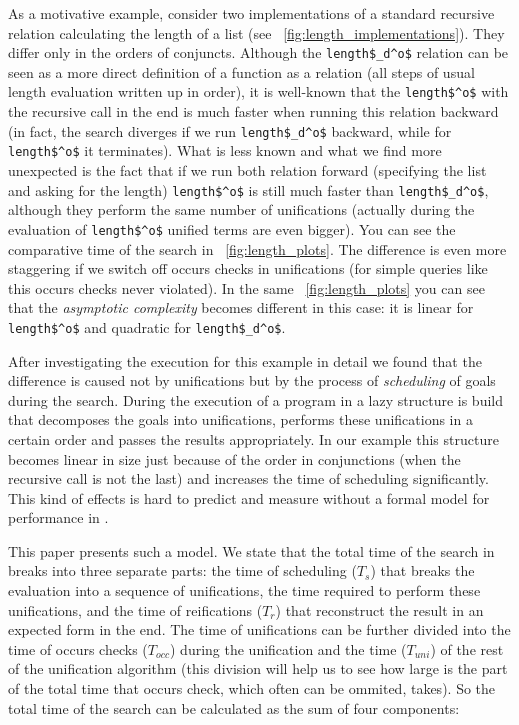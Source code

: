 As a motivative example, consider two implementations of a standard recursive relation calculating the length of a list (see \figureword~\ref{fig:length_implementations}). They differ only in the
orders of conjuncts. Although the \lstinline|length$_d^o$| relation can be seen as a more direct definition of a function as a relation (all steps of usual length evaluation written up in order),
it is well-known that the \lstinline|length$^o$| with the recursive call in the end is much faster when running this relation backward (in fact, the search diverges if we
run \lstinline|length$_d^o$| backward, while for \lstinline|length$^o$| it terminates). What is less known and what we find more unexpected is the fact that if we run both relation
forward (specifying the list and asking for the length) \lstinline|length$^o$| is still much faster than \lstinline|length$_d^o$|, although they perform the same number of unifications
(actually during the evaluation of \lstinline|length$^o$| unified terms are even bigger). You can see the comparative time of the search in \figureword~\ref{fig:length_plots}. The difference is even
more staggering if we switch off occurs checks in unifications (for simple queries like this occurs checks never violated). In the same \figureword~\ref{fig:length_plots} you can see that
the \emph{asymptotic complexity} becomes different in this case: it is linear for \lstinline|length$^o$| and quadratic for \lstinline|length$_d^o$|.

After investigating the execution for this example in detail we found that the difference is caused not by unifications but by the process of \emph{scheduling} of goals during the search.
During the execution of a program in \mK a lazy structure is build that decomposes the goals into unifications, performs these unifications in a certain order and passes the results
appropriately. In our example this structure becomes linear in size just because of the order in conjunctions (when the recursive call is not the last) and increases the time of
scheduling significantly. This kind of effects is hard to predict and measure without a formal model for performance in \mK.

This paper presents such a model. We state that the total time of the search in \mK breaks into three separate parts: the time of scheduling ($T_s$) that breaks the evaluation into a sequence of
unifications, the time required to perform these unifications, and the time of reifications ($T_r$) that reconstruct the result in an expected form in the end. The time of unifications can be further
divided into the time of occurs checks ($T_{occ}$) during the unification and the time ($T_{uni}$) of the rest of the unification algorithm (this division will help us to see how large
is the part of the total time that occurs check, which often can be ommited, takes). So the total time of the search can be calculated as the sum of four components:

